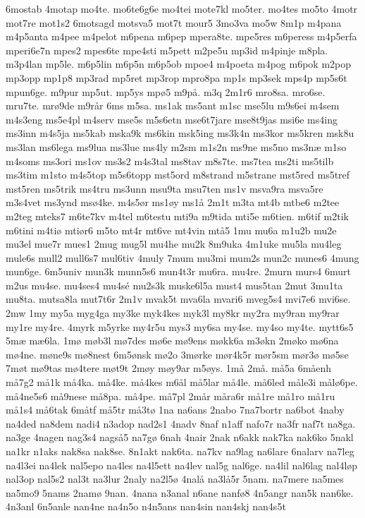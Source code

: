 {6mostab
4motap
mo4te.
mo6te6g6e
mo4tei
mote7kl
mo5ter.
mo4tes
mo5to
4motr
mot7re
mot1s2
6motsagd
motsva5
mot7t
mour5
3mo3va
mo5w
8m1p
m4pana
m4p5anta
m4pee
m4pelot
m6pena
m6pep
mpera8te.
mpe5res
m6peress
m4p5erfa
mperi6e7n
mpes2
mpes6te
mpe4sti
m5pett
m2pe5u
mp3id
m4pinje
m8pla.
m3p4lan
mp5le.
m6p5lin
m6p5n
m6p5ob
mpoe4
m4poeta
m4pog
m6pok
m2pop
mp3opp
mp1p8
mp3rad
mp5ret
mp3rop
mpro8pa
mp1s
mp3sek
mps4p
mp5s6t
mpun6ge.
m9pur
mp5ut.
mp5ys
mpø5
m9på.
m3q
2m1r6
mro8sa.
mro6se.
mru7te.
mrø9de
m9rår
6ms
m5sa.
ms1ak
ms5ant
m1sc
mse5lu
m9s6ei
m4sem
m4s3eng
ms5e4pl
m4serv
mse5s
m5s6etn
mse6t7jare
mse8t9jas
msi6e
ms4ing
ms3inn
m4s5ja
ms5kab
mska9k
ms6kin
msk5ing
ms3k4n
ms3kor
ms5kren
msk8u
ms3lan
ms6lega
ms9lua
ms3lue
ms4ly
m2sm
m1s2n
ms9ne
ms5no
ms3næ
m1so
m4soms
ms3ori
ms1ov
ms3s2
m4s3tal
ms8tav
m8s7te.
ms7tea
ms2ti
ms5tilb
ms3tim
m1sto
m4s5top
m5s6topp
mst5ord
m8strand
m5strane
mst5red
ms5tref
mst5ren
ms5trik
ms4tru
ms3unn
msu9ta
msu7ten
ms1v
msva9ra
msva5re
m3s4vet
ms3ynd
msø4ke.
m4s5ør
ms1øy
ms1å
2m1t
m3ta
mt4b
mtbe6
m2tee
m2teg
mteks7
m6te7kv
m4tel
m6testu
mti9a
m9tida
mti5e
m6tien.
m6tif
m2tik
m6tini
m4tiø
mtiør6
m5to
mt4r
mt6ve
mt4vin
mtå5
1mu
mu6a
m1u2b
mu2e
mu3el
mue7r
mues1
2mug
mug5l
mu4he
mu2k
8m9uka
4m1uke
mu5la
mu4leg
mule6s
mull2
mull6s7
mul6tiv
4muly
7mum
mu3mi
mum2s
mun2c
munes6
4mung
mun6ge.
6m5univ
mun3k
munn5s6
mun4t3r
mu6ra.
mu4re.
2murn
murs4
6murt
m2us
mu4se.
mu4ses4
mu4sé
mu2s3k
muske6l5a
must4
mus5tan
2mut
3mu1ta
mu8ta.
mutsa8la
mut7t6r
2m1v
mvak5t
mva6la
mvari6
mveg5s4
mvi7e6
mvi6se.
2mw
1my
my5a
myg4ga
my3ke
myk4kes
myk3l
my8kr
my2ra
my9ran
my9rar
my1re
my4re.
4myrk
m5yrke
my4r5u
mys3
my6sa
my4se.
my4so
my4te.
mytt6s5
5mæ
mæ6la.
1mø
møb3l
mø7des
mø6e
mø9ens
møkk6a
m3økn
2møko
mø6na
mø4ne.
møne9s
mø8nest
6m5ønsk
mø2o
3mørke
mør4k5r
mør5sm
mør3ø
mø5se
7møt
mø9tas
mø4tere
møt9t
2møy
møy9ar
m5øys.
1må
2må.
må5a
6måenh
må7g2
må1k
må4ka.
må4ke.
må4kes
m6ål
må5lar
må4le.
må6led
måle3i
målø6pe.
må4ne5s6
må9nese
må8pa.
må4pe.
må7pl
2mår
måra6r
må1re
må1ro
må1ru
må1s4
må6tak
6måtf
må5tr
må3tø
1na
na6ans
2nabo
7na7bortr
na6bot
4naby
na4ded
na8dem
nadi4
n3adop
nad2s1
4nadv
8naf
n1aff
nafo7r
na3fr
naf7t
na8ga.
na3ge
4nagen
nag3s4
nagså5
na7gø
6nah
4nair
2nak
n6akk
nak7ka
nak6ko
5nakl
na1kr
n1aks
nak8sa
nak8se.
8n1akt
nak6ta.
na7kv
na9lag
na6lare
6nalarv
na7leg
na4l3ei
na4lek
nal5epo
na4les
na4l5ett
na4lev
nal5g
nal6ge.
na4lil
nal6lag
nal4løp
nal3op
nal5s2
nal3t
na3lur
2naly
na2l5ø
4nalå
na3lå5r
5nam.
na7mere
na5mes
na5mo9
5nams
2namø
9nan.
4nana
n3anal
n6ane
nanfø8
4n5angr
nan5k
nan6ke.
4n3anl
6n5anle
nan4ne
na4n5o
n4n5ans
nan4sin
nan4skj
nan4s5t
}
